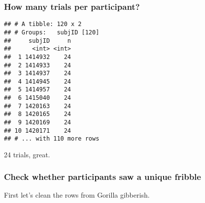 \documentclass[
]{article}
\newenvironment{Shaded}{\begin{snugshade}}{\end{snugshade}}
\newcommand{\KeywordTok}[1]{\textcolor[rgb]{0.13,0.29,0.53}{\textbf{#1}}}
\newcommand{\NormalTok}[1]{#1}
\newcommand{\OperatorTok}[1]{\textcolor[rgb]{0.81,0.36,0.00}{\textbf{#1}}}
\newcommand{\StringTok}[1]{\textcolor[rgb]{0.31,0.60,0.02}{#1}}
\begin{document}
\hypertarget{how-many-trials-per-participant-1}{%
\subsubsection{How many trials per
participant?}\label{how-many-trials-per-participant-1}}

\begin{Shaded}
\end{Shaded}

\begin{verbatim}
## # A tibble: 120 x 2
## # Groups:   subjID [120]
##     subjID     n
##      <int> <int>
##  1 1414932    24
##  2 1414933    24
##  3 1414937    24
##  4 1414945    24
##  5 1414957    24
##  6 1415040    24
##  7 1420163    24
##  8 1420165    24
##  9 1420169    24
## 10 1420171    24
## # ... with 110 more rows
\end{verbatim}

24 trials, great.

\hypertarget{check-whether-participants-saw-a-unique-fribble-1}{%
\subsubsection{Check whether participants saw a unique
fribble}\label{check-whether-participants-saw-a-unique-fribble-1}}

First let's clean the rows from Gorilla gibberish.

\begin{Shaded}
\end{Shaded}
\end{document}
